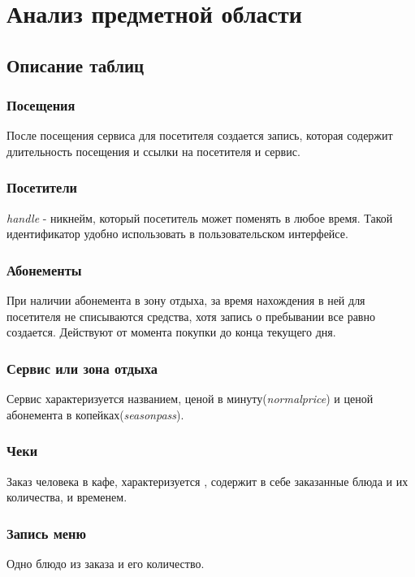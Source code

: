 \documentclass[a4paper]{article}
\begin{document}
\section{Анализ предметной области}
\subsection{Описание таблиц}

\subsubsection{Посещения}
После посещения сервиса для посетителя создается запись, которая содержит длительность посещения и ссылки на посетителя и сервис.

\subsubsection{Посетители}
\emph{handle} - никнейм, который посетитель может поменять в любое время. 
Такой идентификатор удобно использовать в пользовательском интерфейсе.

\subsubsection{Абонементы}
При наличии абонемента в зону отдыха, за время нахождения в ней для посетителя не списываются средства, хотя запись о пребывании все равно создается.
Действуют от момента покупки до конца текущего дня.

\subsubsection{Сервис или зона отдыха}
Сервис характеризуется названием, ценой в минуту(\emph{normalprice}) и ценой абонемента в копейках(\emph{seasonpass}).

\subsubsection{Чеки}
Заказ человека в кафе, характеризуется , содержит в себе заказанные блюда и их количества, и временем.

\subsubsection{Запись меню}
Одно блюдо из заказа и его количество.
\end{document}
